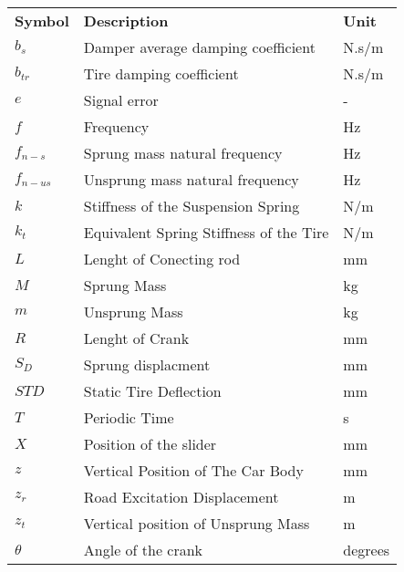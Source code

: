 \begin{longtable}{lll}                                             \\
		
	\textbf{Symbol} & \textbf{Description} & \textbf{Unit} \\  
	$b_{s}$  & Damper average damping coefficient & N.s/m \\  
	$b_{tr}$ & Tire damping coefficient & N.s/m \\  
	$e$     & Signal error & - \\  
	$f$     & Frequency & Hz \\  
	$f_{n-s}$ & Sprung mass natural frequency & Hz \\  
	$f_{n-{us}}$ & Unsprung mass natural frequency & Hz \\  
	$k$     & Stiffness of the Suspension Spring & N/m \\  
	$k_{t}$ & Equivalent Spring Stiffness of the Tire & N/m \\  
	$L$     & Lenght of Conecting rod & mm \\  
	$M$     & Sprung Mass & kg \\  
	$m$     & Unsprung Mass & kg \\  
	$R$     & Lenght of Crank & mm \\  
	$S_D$   & Sprung displacment & mm \\  
	$STD$   & Static Tire Deflection & mm \\  
	$T$     & Periodic Time & s \\  
	$X$     & Position of the slider & mm \\  
	$z$     & Vertical Position of The Car Body & mm \\  
	$z_{{r}}$ & Road Excitation Displacement & m \\  
	$z_{{t}}$ & Vertical position of Unsprung Mass & m \\  
	$\theta$ & Angle of the crank & degrees \\  
	
	



\end{longtable}
